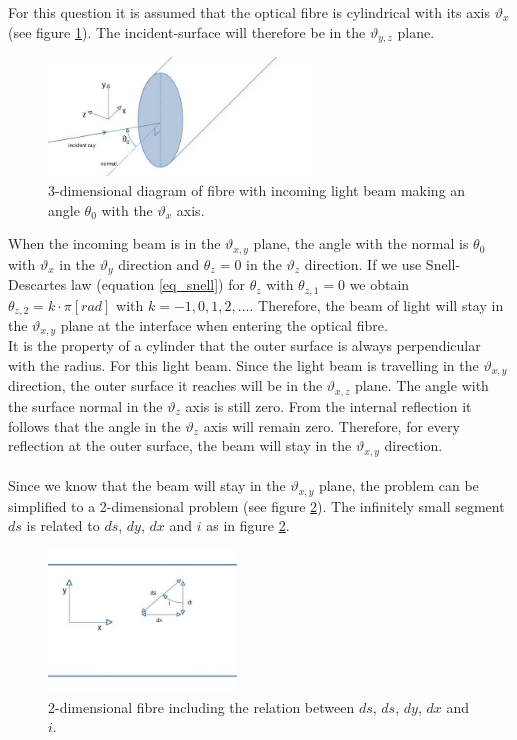 \documentclass{article}
\begin{document}
For this question it is assumed that the optical fibre is cylindrical with its axis $\vartheta _x$ (see figure \ref{fig_fibre_3d}). The incident-surface will therefore be in the $\vartheta _{y,z}$ plane.\\

\begin{figure}[h!]
	\centering
	\includegraphics[width=7cm]{afbeeldingen/fibre_3d.jpg}
	\caption{3-dimensional diagram of fibre with incoming light beam making an angle $\theta _0$ with the $\vartheta _x$ axis.}
	\label{fig_fibre_3d}
\end{figure}
When the incoming beam is in the $\vartheta _{x,y}$ plane, the angle with the normal is $\theta _0$ with $\vartheta _x$ in the $\vartheta _y$ direction and $\theta _z = 0$ in the $\vartheta _z$ direction. If we use Snell-Descartes law (equation \ref{eq_snell}) for $\theta _z$ with $\theta _{z,1} = 0$ we obtain $\theta _{z,2} = k \cdot \pi [rad]$ with $k = -1,0,1,2,...$. Therefore, the beam of light will stay in the $\vartheta _{x,y}$ plane at the interface when entering the optical fibre. \\
It is the property of a cylinder that the outer surface is always perpendicular with the radius. For this light beam. Since the light beam is travelling in the $\vartheta _{x,y}$ direction, the outer surface it reaches will be in the $\vartheta _{x,z}$ plane. The angle with the surface normal in the $\vartheta _z$ axis is still zero. From the internal reflection it follows that the angle in  the $\vartheta _z$ axis will remain zero. Therefore, for every reflection at the outer surface, the beam will stay in the $\vartheta _{x,y}$ direction.\\
\\
Since we know that the beam will stay in the $\vartheta _{x,y}$ plane, the problem can  be simplified to a 2-dimensional problem (see figure \ref{fig_fibre_2d}). The infinitely small segment $ds$ is related to $ds$, $dy$, $dx$ and $i$ as in figure \ref{fig_fibre_2d}.


\begin{figure}[h!]
	\centering
	\includegraphics[width = 5cm]{afbeeldingen/fibre_2d.jpg}
	\caption{2-dimensional fibre including the relation between $ds$, $ds$, $dy$, $dx$ and $i$.}
	\label{fig_fibre_2d}
\end{figure}
\end{document}
